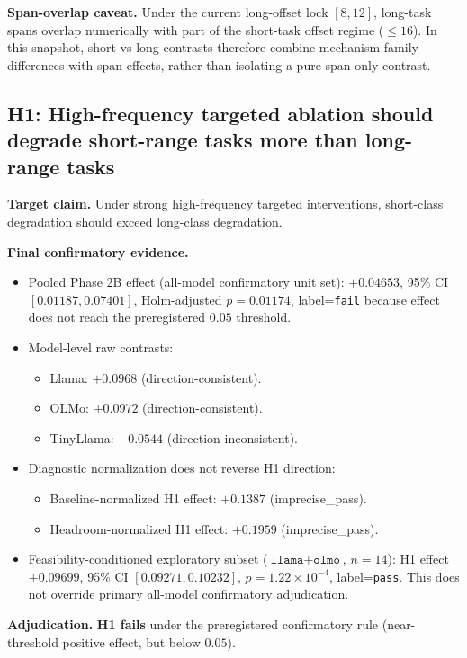 \documentclass[11pt]{article}
\begin{document}
\noindent
\textbf{Span-overlap caveat.} Under the current long-offset lock \([8,12]\), long-task spans overlap numerically with part of the short-task offset regime (\(\le 16\)). In this snapshot, short-vs-long contrasts therefore combine mechanism-family differences with span effects, rather than isolating a pure span-only contrast.

\subsection{H1: High-frequency targeted ablation should degrade short-range tasks more than long-range tasks}
\textbf{Target claim.} Under strong high-frequency targeted interventions, short-class degradation should exceed long-class degradation.

\textbf{Final confirmatory evidence.}
\begin{itemize}[leftmargin=*]
  \item Pooled Phase 2B effect (all-model confirmatory unit set): \(+0.04653\), 95\% CI \([0.01187, 0.07401]\), Holm-adjusted \(p=0.01174\), label=\texttt{fail} because effect does not reach the preregistered \(0.05\) threshold.
  \item Model-level raw contrasts:
  \begin{itemize}
    \item Llama: \(+0.0968\) (direction-consistent).
    \item OLMo: \(+0.0972\) (direction-consistent).
    \item TinyLlama: \(-0.0544\) (direction-inconsistent).
  \end{itemize}
  \item Diagnostic normalization does not reverse H1 direction:
  \begin{itemize}
    \item Baseline-normalized H1 effect: \(+0.1387\) (imprecise\_pass).
    \item Headroom-normalized H1 effect: \(+0.1959\) (imprecise\_pass).
  \end{itemize}
  \item Feasibility-conditioned exploratory subset (\(\texttt{llama}+\texttt{olmo}\), \(n=14\)): H1 effect \(+0.09699\), 95\% CI \([0.09271, 0.10232]\), \(p=1.22\times 10^{-4}\), label=\texttt{pass}. This does not override primary all-model confirmatory adjudication.
\end{itemize}

\textbf{Adjudication.} \textbf{H1 fails} under the preregistered confirmatory rule (near-threshold positive effect, but below \(0.05\)).
\end{document}
